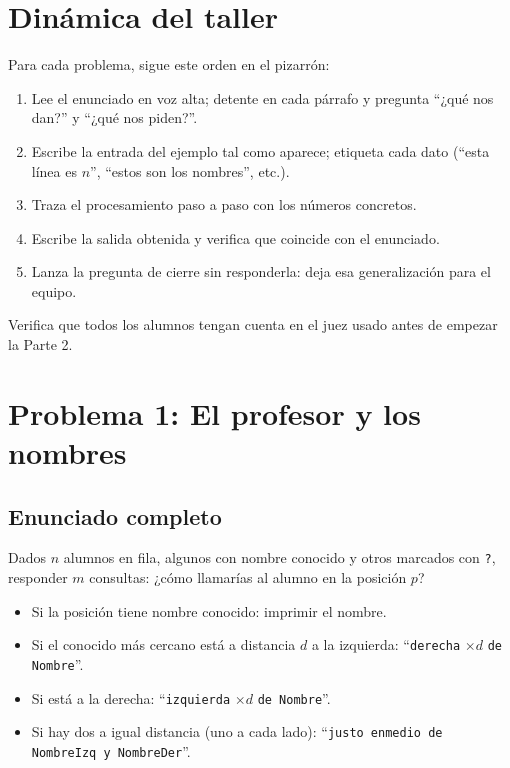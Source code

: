 \documentclass[12pt, oneside]{article}
\begin{document}
\section{Dinámica del taller}

\begin{notaprofesor}
  Para cada problema, sigue este orden en el pizarrón:
  \begin{enumerate}
    \item Lee el enunciado en voz alta; detente en cada párrafo y
          pregunta ``¿qué nos dan?'' y ``¿qué nos piden?''.
    \item Escribe la entrada del ejemplo tal como aparece; etiqueta
          cada dato (``esta línea es $n$'', ``estos son los nombres'', etc.).
    \item Traza el procesamiento paso a paso con los números concretos.
    \item Escribe la salida obtenida y verifica que coincide con el
          enunciado.
    \item Lanza la pregunta de cierre sin responderla: deja esa
          generalización para el equipo.
  \end{enumerate}
\end{notaprofesor}

\begin{notaprofesor}
  Verifica que todos los alumnos tengan cuenta en el juez usado antes
  de empezar la Parte 2.
\end{notaprofesor}

\newpage

\section{Problema 1: El profesor y los nombres}

\subsection{Enunciado completo}

Dados $n$ alumnos en fila, algunos con nombre conocido y otros marcados
con \texttt{?}, responder $m$ consultas: ¿cómo llamarías al alumno en
la posición $p$?

\begin{itemize}
  \item Si la posición tiene nombre conocido: imprimir el nombre.
  \item Si el conocido más cercano está a distancia $d$ a la izquierda:
        ``\texttt{derecha} $\times d$ \texttt{de Nombre}''.
  \item Si está a la derecha: ``\texttt{izquierda} $\times d$
        \texttt{de Nombre}''.
  \item Si hay dos a igual distancia (uno a cada lado):
        ``\texttt{justo enmedio de NombreIzq y NombreDer}''.
\end{itemize}
\end{document}
